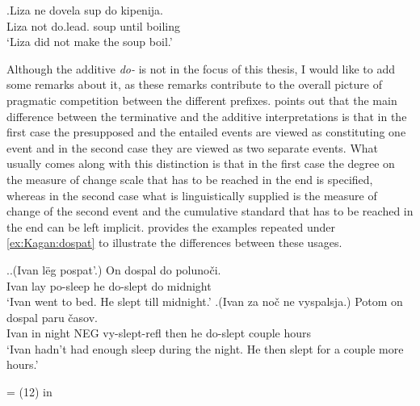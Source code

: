 \exg.\label{ex:do:PP:ne}Liza ne dovela sup do kipenija.\\
Liza not do.lead. soup until boiling\\
\vspace{0.5em}
`Liza did not make the soup boil.'

Although the additive \textit{do-} is not in the focus of this thesis, I would like to add some remarks about it, as these remarks contribute to the overall picture of pragmatic competition between the different prefixes. \citet[79]{Kagan:book} points out that the main difference between the terminative and the additive interpretations is that in the first case the presupposed and the entailed events are viewed as constituting one event and in the second case they are viewed as two separate events. What usually comes along with this distinction is that in the first case the degree on the measure of change scale that has to be reached in the end is specified, whereas in the second case what is linguistically supplied is the measure of change of the second event and the cumulative standard that has to be reached in the end can be left implicit. \citet[p 79]{Kagan:book} provides the examples repeated under \ref{ex:Kagan:dospat} to illustrate the differences between these usages.

\ex.\label{ex:Kagan:dospat}\ag.\label{ex:Kagan:dospat:1}(Ivan l\"{e}g pospat'.) On dospal do poluno\v{c}i.\\
Ivan lay po-sleep he do-slept do midnight\\
\vspace{0.5em}
`Ivan went to bed. He slept till midnight.'
\bg.\label{ex:Kagan:dospat:2}(Ivan za no\v{c} ne vyspalsja.) Potom on dospal paru \v{c}asov.\\
Ivan in night NEG vy-slept-refl then he do-slept couple hours\\
\vspace{0.5em}
`Ivan hadn't had enough sleep during the night. He then slept for a couple more hours.'
\begin{flushright}
\vspace{-0.5em}
= (12) in \citet[79]{Kagan:book}
\end{flushright}

